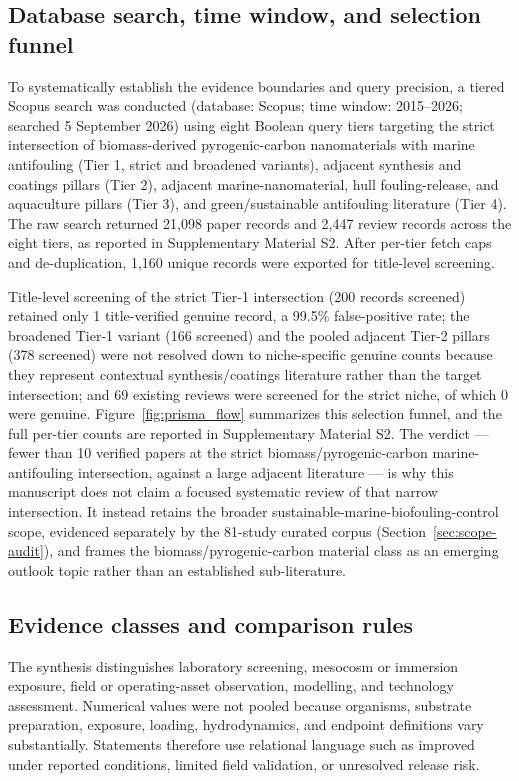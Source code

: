 \subsection{Database search, time window, and selection funnel}
To systematically establish the evidence boundaries and query precision, a tiered Scopus search was conducted (database: Scopus; time window: 2015--2026; searched 5 September 2026) using eight Boolean query tiers targeting the strict intersection of biomass-derived pyrogenic-carbon nanomaterials with marine antifouling (Tier 1, strict and broadened variants), adjacent synthesis and coatings pillars (Tier 2), adjacent marine-nanomaterial, hull fouling-release, and aquaculture pillars (Tier 3), and green/sustainable antifouling literature (Tier 4). The raw search returned 21{,}098 paper records and 2{,}447 review records across the eight tiers, as reported in Supplementary Material S2. After per-tier fetch caps and de-duplication, 1{,}160 unique records were exported for title-level screening.

Title-level screening of the strict Tier-1 intersection (200 records screened) retained only 1 title-verified genuine record, a 99.5\% false-positive rate; the broadened Tier-1 variant (166 screened) and the pooled adjacent Tier-2 pillars (378 screened) were not resolved down to niche-specific genuine counts because they represent contextual synthesis/coatings literature rather than the target intersection; and 69 existing reviews were screened for the strict niche, of which 0 were genuine. Figure~\ref{fig:prisma_flow} summarizes this selection funnel, and the full per-tier counts are reported in Supplementary Material S2. The verdict --- fewer than 10 verified papers at the strict biomass/pyrogenic-carbon marine-antifouling intersection, against a large adjacent literature --- is why this manuscript does not claim a focused systematic review of that narrow intersection. It instead retains the broader sustainable-marine-biofouling-control scope, evidenced separately by the 81-study curated corpus (Section~\ref{sec:scope-audit}), and frames the biomass/pyrogenic-carbon material class as an emerging outlook topic rather than an established sub-literature.

\subsection{Evidence classes and comparison rules}
The synthesis distinguishes laboratory screening, mesocosm or immersion exposure, field or operating-asset observation, modelling, and technology assessment. Numerical values were not pooled because organisms, substrate preparation, exposure, loading, hydrodynamics, and endpoint definitions vary substantially. Statements therefore use relational language such as improved under reported conditions, limited field validation, or unresolved release risk.

